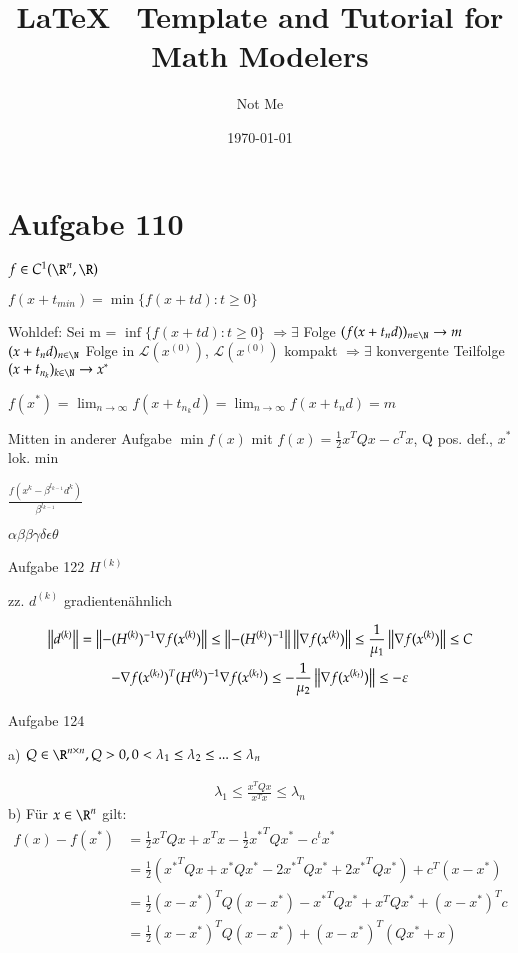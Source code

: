 \documentclass[12pt]{article}   %
\title{LaTeX \, Template and Tutorial for Math Modelers}
\author{Not Me}
\date{\today}
\begin{document}
\section{Aufgabe 110}

$f \in C^1(\R^n, \R)$

$f(x + t_{min}) = \min\{f(x+td) : t \geq 0\}$

Wohldef: Sei m = $\inf\{f(x+td) : t \geq 0 \}$ 
\newline$\Rightarrow\exists$ Folge $(f(x+t_nd))_{n\in\N} \to m$
\\$(x+t_nd)_{n\in\N}$ Folge in $\mathcal{L}(x^{(0)})$, $\mathcal{L}(x^{(0)})$ kompakt
\newline$\Rightarrow\exists$ konvergente Teilfolge $(x+t_{n_k})_{k\in\N}\to x^*$

$f(x^*)$ = $\lim_{n \to \infty} f(x+t_{n_k}d) = \lim_{n\to\infty}f(x+t_nd) = m$

Mitten in anderer Aufgabe
$\min f(x)$ mit $f(x) = \frac12 x^TQx-c^Tx$, Q pos. def., $x^*$ lok. min

$\frac{f(x^k-\beta^{l_{k-1}}d^k)}{\beta^{l_{k-1}}}$

$\alpha\beta\beta\gamma\delta\epsilon\theta$

Aufgabe 122
$H^{(k)}$


zz. $d^{(k)}$ gradientenähnlich

\begin{gather}
	\left\lVert d^{(k)}\right\rVert = \left\lVert-(H^{(k)})^{-1}  \nabla f(x^{(k)})\right\rVert \leq \left\lVert-(H^{(k)})^{-1}\right\rVert \left\lVert\nabla f(x^{(k)})\right\rVert \leq \frac 1{\mu_1} \left\lVert\nabla f(x^{(k)})\right\rVert \leq C  \\
-\nabla f(x^{(k_t)})^T(H^{(k)})^{-1}\nabla f(x^{(k_t)}) \leq -\frac 1{\mu_2}\left\lVert\nabla f(x^{(k_t)})\right\rVert \leq -\varepsilon
\end{gather}

\vspace{3cm}
Aufgabe 124

a) $Q \in \R^{n\times n}, Q > 0, 0 < \lambda_1 \leq \lambda_2 \leq ... \leq \lambda_n$

\begin{gather}
	\lambda_1 \leq \frac{x^TQx}{x^Tx} \leq \lambda_n
\end{gather}
b) Für $x\in\R^n$ gilt:
\begin{align}
	f(x)-f(x^*) &= \frac12x^TQx+x^Tx-\frac12{x^*}^TQx^*-c^tx^* \\
	&= \frac12({x^*}^TQx+x^*Qx^*-2{x^*}^TQx^*+2{x^*}^TQx^*) + c^T(x-x^*) \\
	&= \frac12(x-x^*)^TQ(x-x^*) - {x^*}^TQx^*+x^TQx^*+(x-x^*)^Tc \\
	&= \frac12(x-x^*)^TQ(x-x^*)+ (x-x^*)^T(Qx^*+x)
\end{align}
\end{document}
